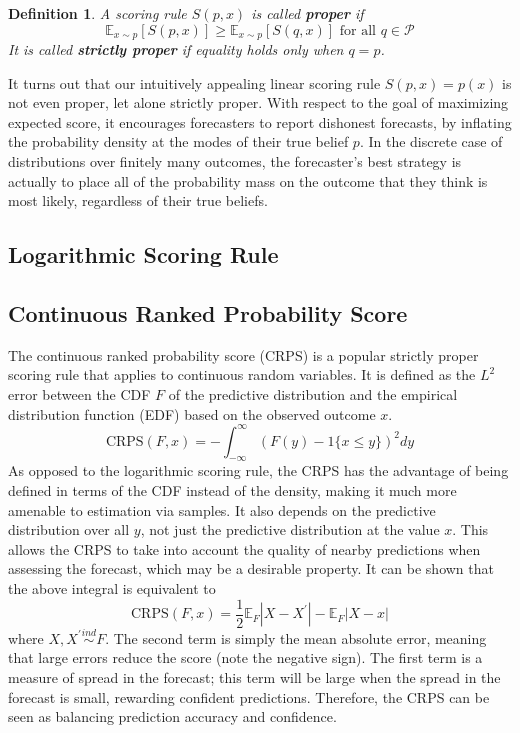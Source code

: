 \documentclass[12pt]{article}
\newcommand*{\abs}[1]{\left\lvert#1\right\rvert}
\newcommand{\E}{\mathbb{E}}
\newtheorem{definition}{Definition}
\begin{document}
\begin{definition}
A scoring rule $S(p, x)$ is called \textbf{proper} if 
\[\E_{x \sim p}\left[S(p, x) \right] \geq \E_{x \sim p}\left[S(q, x) \right] \text{ for all } q  \in \mathcal{P}\]
It is called \textbf{strictly proper} if equality holds only when $q = p$. 
\end{definition}

It turns out that our intuitively appealing linear scoring rule $S(p, x) = p(x)$ is not even proper, let alone strictly proper. With respect to the goal of maximizing expected score, it encourages forecasters to report dishonest forecasts, 
by inflating the probability density at the modes of their true belief $p$. In the discrete case of distributions over finitely many outcomes, the forecaster's best strategy is actually to place all of the probability mass on the outcome that 
they think is most likely, regardless of their true beliefs. 

\subsection{Logarithmic Scoring Rule}

\subsection{Continuous Ranked Probability Score}
The continuous ranked probability score (CRPS) is a popular strictly proper scoring rule that applies to continuous random variables. It is defined as the $L^2$ error between the CDF $F$ of the predictive distribution and the 
empirical distribution function (EDF) based on the observed outcome $x$. 
\[\text{CRPS}(F, x) = -\int_{-\infty}^{\infty} \left(F(y) - 1\{x \leq y\} \right)^2 dy \]
As opposed to the logarithmic scoring rule, the CRPS has the advantage of being defined in terms of the CDF instead of the density, making it much more amenable to estimation via samples. It also depends on the predictive 
distribution over all $y$, not just the predictive distribution at the value $x$. This allows the CRPS to take into account the quality of nearby predictions when assessing the forecast, which may be a desirable property. It can be 
shown that the above integral is equivalent to 
\[\text{CRPS}(F, x) = \frac{1}{2} \E_F \abs{X - X^\prime} - \E_F \abs{X - x}\]
where $X, X^\prime \overset{ind}{\sim} F$. The second term is simply the mean absolute error, meaning that large errors reduce the score (note the negative sign). The first term is a measure of spread in the forecast; this term 
will be large when the spread in the forecast is small, rewarding confident predictions. Therefore, the CRPS can be seen as balancing prediction accuracy and confidence. 
\end{document}

